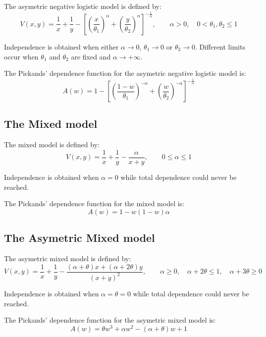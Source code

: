 \documentclass[a4paper]{article}
\numberwithin{equation}{section}
\theoremstyle{definition}
\begin{document}
The asymetric negative logistic model is defined by:
\begin{displaymath}
  V(x,y) = \frac{1}{x} + \frac{1}{y} - \left[ \left(\frac{x}{\theta_1}
    \right)^\alpha  + \left(\frac{y}{\theta_2} \right)^\alpha
  \right]^{-\frac{1}{\alpha}}, \qquad \alpha > 0, \quad 0 <
  \theta_1, \theta_2 \leq 1
\end{displaymath}

Independence is obtained when either $\alpha \rightarrow 0$, $\theta_1
\rightarrow 0$ or $\theta_2 \rightarrow 0$. Different limits occur
when $\theta_1$ and $\theta_2$ are fixed and $\alpha \rightarrow
+\infty$.

The Pickands' dependence function for the asymetric negative logistic
model is:
\begin{displaymath}
  A(w) = 1 - \left[ \left(\frac{1 - w}{\theta_1} \right)^{-\alpha} + 
    \left(\frac{w}{\theta_2} \right)^{-\alpha}
  \right]^{-\frac{1}{\alpha}}
\end{displaymath}

\subsection{The Mixed model}

The mixed model is defined by:
\begin{displaymath}
  V(x,y) = \frac{1}{x} + \frac{1}{y} - \frac{\alpha}{x+y}, \qquad 0
  \leq \alpha \leq 1
\end{displaymath}

Independence is obtained when $\alpha = 0$ while total dependence
could never be reached.

The Pickands' dependence function for the mixed model is:
\begin{displaymath}
  A(w) = 1 - w  \left(1 -w\right) \alpha
\end{displaymath}

\subsection{The Asymetric Mixed model}

The asymetric mixed model is defined by:
\begin{displaymath}
  V(x,y) = \frac{1}{x} + \frac{1}{y} - \frac{\left( \alpha + \theta
    \right) x + \left(\alpha + 2\theta \right) y}{\left( x+ y
    \right)^2}, \qquad \alpha \geq 0,\quad \alpha + 2 \theta \leq 1,
  \quad  \alpha + 3\theta \geq 0
\end{displaymath}

Independence is obtained when $\alpha = \theta = 0$ while total
dependence could never be reached.

The Pickands' dependence function for the asymetric mixed model is:
\begin{displaymath}
  A(w) = \theta w^3 + \alpha w^2 - \left(\alpha + \theta \right) w +
  1
\end{displaymath}



\end{document}
